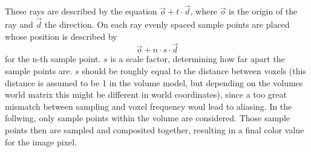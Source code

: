 {These rays are described by the equation $\vec{o} + t \cdot \vec{d}$, where $\vec{o}$ is the origin of the ray and $\vec{d}$ the direction. On each ray evenly spaced sample points are placed whose position is described by 
\begin{equation}
\vec{o} + n \cdot s \cdot \vec{d}
\end{equation}
for the n-th sample point. $s$ is a scale factor, determining how far apart the sample points are. $s$ should be roughly equal to the distance between voxels (this distance is assumed to be 1 in the volume model, but depending on the volumes world matrix this might be different in world coordinates), since a too great mismatch between sampling and voxel frequency woul lead to aliasing.
In the follwing, only sample points within the volume are considered. Those sample points then are sampled and composited together, resulting in a final color value for the image pixel.
}
